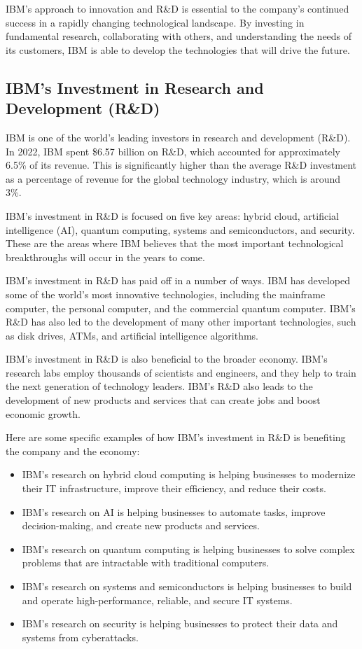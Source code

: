 IBM's approach to innovation and R\&D is essential to the company's continued success in a rapidly changing technological landscape. By investing in fundamental research, collaborating with others, and understanding the needs of its customers, IBM is able to develop the technologies that will drive the future.

\subsection{IBM's Investment in Research and Development (R\&D)}

IBM is one of the world's leading investors in research and development (R\&D). In 2022, IBM spent \$6.57 billion on R\&D, which accounted for approximately 6.5\% of its revenue. This is significantly higher than the average R\&D investment as a percentage of revenue for the global technology industry, which is around 3\%.

IBM's investment in R\&D is focused on five key areas: hybrid cloud, artificial intelligence (AI), quantum computing, systems and semiconductors, and security. These are the areas where IBM believes that the most important technological breakthroughs will occur in the years to come.

IBM's investment in R\&D has paid off in a number of ways. IBM has developed some of the world's most innovative technologies, including the mainframe computer, the personal computer, and the commercial quantum computer. IBM's R\&D has also led to the development of many other important technologies, such as disk drives, ATMs, and artificial intelligence algorithms.

IBM's investment in R\&D is also beneficial to the broader economy. IBM's research labs employ thousands of scientists and engineers, and they help to train the next generation of technology leaders. IBM's R\&D also leads to the development of new products and services that can create jobs and boost economic growth.

Here are some specific examples of how IBM's investment in R\&D is benefiting the company and the economy:

\begin{itemize}
  \item IBM's research on hybrid cloud computing is helping businesses to modernize their IT infrastructure, improve their efficiency, and reduce their costs.
  \item IBM's research on AI is helping businesses to automate tasks, improve decision-making, and create new products and services.
  \item IBM's research on quantum computing is helping businesses to solve complex problems that are intractable with traditional computers.
  \item IBM's research on systems and semiconductors is helping businesses to build and operate high-performance, reliable, and secure IT systems.
  \item IBM's research on security is helping businesses to protect their data and systems from cyberattacks.
\end{itemize}

